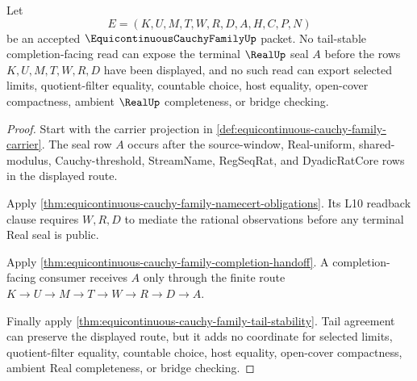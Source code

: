 \begin{theorem}
\label{thm:equicontinuous-cauchy-family-real-seal-tail-nonescape}
Let
$$
E=(K,U,M,T,W,R,D,A,H,C,P,N)
$$
be an accepted $\EquicontinuousCauchyFamilyUp$ packet. No tail-stable completion-facing read can expose the terminal $\RealUp$ seal $A$ before the rows $K,U,M,T,W,R,D$ have been displayed, and no such read can export selected limits, quotient-filter equality, countable choice, host equality, open-cover compactness, ambient $\RealUp$ completeness, or bridge checking.
\end{theorem}
\begin{proof}
Start with the carrier projection in \autoref{def:equicontinuous-cauchy-family-carrier}. The seal row $A$ occurs after the source-window, Real-uniform, shared-modulus, Cauchy-threshold, StreamName, RegSeqRat, and DyadicRatCore rows in the displayed route.

Apply \autoref{thm:equicontinuous-cauchy-family-namecert-obligations}. Its L10 readback clause requires $W,R,D$ to mediate the rational observations before any terminal Real seal is public.

Apply \autoref{thm:equicontinuous-cauchy-family-completion-handoff}. A completion-facing consumer receives $A$ only through the finite route $K\to U\to M\to T\to W\to R\to D\to A$.

Finally apply \autoref{thm:equicontinuous-cauchy-family-tail-stability}. Tail agreement can preserve the displayed route, but it adds no coordinate for selected limits, quotient-filter equality, countable choice, host equality, open-cover compactness, ambient Real completeness, or bridge checking.
\end{proof}


